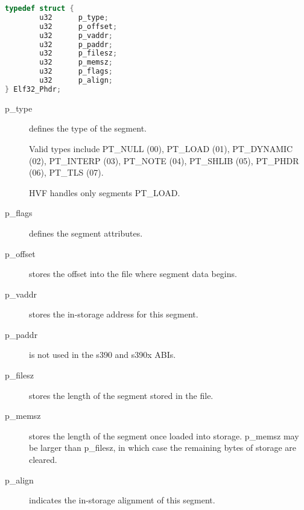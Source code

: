 \begin{lstlisting}[language=C]
typedef struct {
        u32      p_type;
        u32      p_offset;
        u32      p_vaddr;
        u32      p_paddr;
        u32      p_filesz;
        u32      p_memsz;
        u32      p_flags;
        u32      p_align;
} Elf32_Phdr;
\end{lstlisting}

\begin{description}
\item[p\_type] defines the type of the segment.

	Valid types include PT\_NULL (00), PT\_LOAD (01), PT\_DYNAMIC (02),
	PT\_INTERP (03), PT\_NOTE (04), PT\_SHLIB (05), PT\_PHDR (06),
	PT\_TLS (07).

	HVF handles only segments PT\_LOAD.

\item[p\_flags] defines the segment attributes.

\item[p\_offset] stores the offset into the file where segment data begins.

\item[p\_vaddr] stores the in-storage address for this segment.

\item[p\_paddr] is not used in the s390 and s390x ABIs.

\item[p\_filesz] stores the length of the segment stored in the file.

\item[p\_memsz] stores the length of the segment once loaded into storage.
	p\_memsz may be larger than p\_filesz, in which case the remaining
	bytes of storage are cleared.

\item[p\_align] indicates the in-storage alignment of this segment.
\end{description}
\cbend
